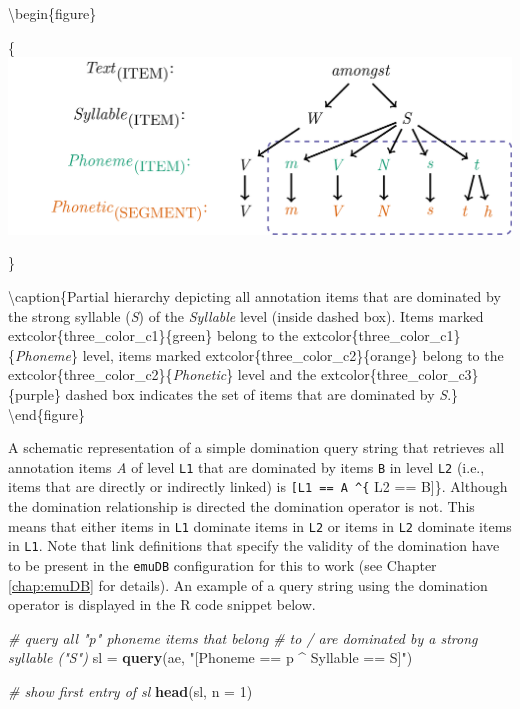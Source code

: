 \documentclass[]{book}
\newenvironment{Shaded}{\begin{snugshade}}{\end{snugshade}}
\newcommand{\CommentTok}[1]{\textcolor[rgb]{0.56,0.35,0.01}{\textit{#1}}}
\newcommand{\DataTypeTok}[1]{\textcolor[rgb]{0.13,0.29,0.53}{#1}}
\newcommand{\DecValTok}[1]{\textcolor[rgb]{0.00,0.00,0.81}{#1}}
\newcommand{\KeywordTok}[1]{\textcolor[rgb]{0.13,0.29,0.53}{\textbf{#1}}}
\newcommand{\NormalTok}[1]{#1}
\newcommand{\StringTok}[1]{\textcolor[rgb]{0.31,0.60,0.02}{#1}}
\begin{document}
\textbackslash{}begin\{figure\}

\{\centering \includegraphics[width=0.75\linewidth]{pics/amongstHierDomination}

\}

\textbackslash{}caption\{Partial hierarchy depicting all annotation items that are dominated by the strong syllable (\emph{S}) of the \emph{Syllable} level (inside dashed box). Items marked extcolor\{three\_color\_c1\}\{green\} belong to the extcolor\{three\_color\_c1\}\{\emph{Phoneme}\} level, items marked extcolor\{three\_color\_c2\}\{orange\} belong to the extcolor\{three\_color\_c2\}\{\emph{Phonetic}\} level and the extcolor\{three\_color\_c3\}\{purple\} dashed box indicates the set of items that are dominated by \emph{S}.\}\label{fig:amongstHierDomintation}
\textbackslash{}end\{figure\}

A schematic representation of a simple domination query string that retrieves all annotation items \emph{A} of level \texttt{L1} that are dominated by items \texttt{B} in level \texttt{L2} (i.e., items that are directly or indirectly linked) is \texttt{{[}L1\ ==\ A\ \^{}\{} L2 == B{]}\}. Although the domination relationship is directed the domination operator is not. This means that either items in \texttt{L1} dominate items in \texttt{L2} or items in \texttt{L2} dominate items in \texttt{L1}. Note that link definitions that specify the validity of the domination have to be present in the \texttt{emuDB} configuration for this to work (see Chapter \ref{chap:emuDB} for details). An example of a query string using the domination operator is displayed in the R code snippet below.

\begin{Shaded}
\begin{Highlighting}[]
\CommentTok{# query all "p" phoneme items that belong}
\CommentTok{# to / are dominated by a strong syllable ("S")}
\NormalTok{sl =}\StringTok{ }\KeywordTok{query}\NormalTok{(ae, }\StringTok{"[Phoneme == p ^ Syllable == S]"}\NormalTok{)}

\CommentTok{# show first entry of sl}
\KeywordTok{head}\NormalTok{(sl, }\DataTypeTok{n =} \DecValTok{1}\NormalTok{)}
\end{Highlighting}
\end{Shaded}
\end{document}
